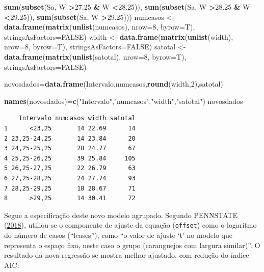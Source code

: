 \documentclass[12pt,brazil,oneside]{book}
\newenvironment{Shaded}{\begin{snugshade}}{\end{snugshade}}
\newcommand{\DataTypeTok}[1]{\textcolor[rgb]{0.13,0.29,0.53}{#1}}
\newcommand{\DecValTok}[1]{\textcolor[rgb]{0.00,0.00,0.81}{#1}}
\newcommand{\FloatTok}[1]{\textcolor[rgb]{0.00,0.00,0.81}{#1}}
\newcommand{\KeywordTok}[1]{\textcolor[rgb]{0.13,0.29,0.53}{\textbf{#1}}}
\newcommand{\NormalTok}[1]{#1}
\newcommand{\OperatorTok}[1]{\textcolor[rgb]{0.81,0.36,0.00}{\textbf{#1}}}
\newcommand{\OtherTok}[1]{\textcolor[rgb]{0.56,0.35,0.01}{#1}}
\newcommand{\StringTok}[1]{\textcolor[rgb]{0.31,0.60,0.02}{#1}}
\begin{document}
\begin{Shaded}
\begin{Highlighting}[]
              \KeywordTok{sum}\NormalTok{(}\KeywordTok{subset}\NormalTok{(Sa, W }\OperatorTok{>}\FloatTok{27.25} \OperatorTok{&}\StringTok{ }\NormalTok{W }\OperatorTok{<}\FloatTok{28.25}\NormalTok{)),}
              \KeywordTok{sum}\NormalTok{(}\KeywordTok{subset}\NormalTok{(Sa, W }\OperatorTok{>}\FloatTok{28.25} \OperatorTok{&}\StringTok{ }\NormalTok{W }\OperatorTok{<}\FloatTok{29.25}\NormalTok{)),}
              \KeywordTok{sum}\NormalTok{(}\KeywordTok{subset}\NormalTok{(Sa, W }\OperatorTok{>}\FloatTok{29.25}\NormalTok{)))}
\NormalTok{numcasos <-}\StringTok{ }\KeywordTok{data.frame}\NormalTok{(}\KeywordTok{matrix}\NormalTok{(}\KeywordTok{unlist}\NormalTok{(numcasos), }\DataTypeTok{nrow=}\DecValTok{8}\NormalTok{, }\DataTypeTok{byrow=}\NormalTok{T),}
                       \DataTypeTok{stringsAsFactors=}\OtherTok{FALSE}\NormalTok{)}
\NormalTok{width <-}\StringTok{ }\KeywordTok{data.frame}\NormalTok{(}\KeywordTok{matrix}\NormalTok{(}\KeywordTok{unlist}\NormalTok{(width), }\DataTypeTok{nrow=}\DecValTok{8}\NormalTok{, }\DataTypeTok{byrow=}\NormalTok{T),}
                    \DataTypeTok{stringsAsFactors=}\OtherTok{FALSE}\NormalTok{)}
\NormalTok{satotal <-}\StringTok{ }\KeywordTok{data.frame}\NormalTok{(}\KeywordTok{matrix}\NormalTok{(}\KeywordTok{unlist}\NormalTok{(satotal), }\DataTypeTok{nrow=}\DecValTok{8}\NormalTok{, }\DataTypeTok{byrow=}\NormalTok{T),}
                      \DataTypeTok{stringsAsFactors=}\OtherTok{FALSE}\NormalTok{)}

\NormalTok{novosdados=}\KeywordTok{data.frame}\NormalTok{(Intervalo,numcasos,}\KeywordTok{round}\NormalTok{(width,}\DecValTok{2}\NormalTok{),satotal)}

\KeywordTok{names}\NormalTok{(novosdados)=}\KeywordTok{c}\NormalTok{(}\StringTok{"Intervalo"}\NormalTok{,}\StringTok{"numcasos"}\NormalTok{,}\StringTok{"width"}\NormalTok{,}\StringTok{"satotal"}\NormalTok{)}
\NormalTok{novosdados}
\end{Highlighting}
\end{Shaded}

\begin{verbatim}
    Intervalo numcasos width satotal
1      <23,25       14 22.69      14
2 23,25-24,25       14 23.84      20
3 24,25-25,25       28 24.77      67
4 25,25-26,25       39 25.84     105
5 26,25-27,25       22 26.79      63
6 27,25-28,25       24 27.74      93
7 28,25-29,25       18 28.67      71
8      >29,25       14 30.41      72
\end{verbatim}

Segue a especificação deste novo modelo agrupado. Segundo PENNSTATE (\protect\hyperlink{ref-penn2018}{2018}), utiliou-se o componente de ajuste da equação (\texttt{offset}) como o logarítmo do número de casos (``lcases''), como ``o valor de ajuste `t' no modelo que representa o espaço fixo, neste caso o grupo (caranguejos com largura similar)''. O resultado da nova regressão se mostra melhor ajustado, com redução do índice AIC:
\end{document}
